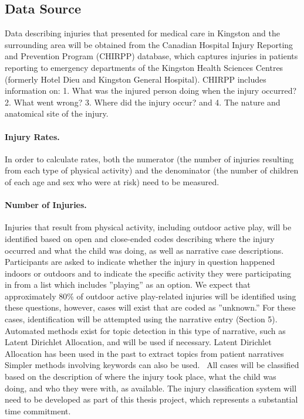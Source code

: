 \documentclass [11pt]{article}
\begin{document}
\subsection{Data Source} 

Data describing injuries that presented for medical care in Kingston and the surrounding area will be obtained from the Canadian Hospital Injury Reporting and Prevention Program (CHIRPP) database, which captures injuries in patients reporting to emergency departments of the Kingston Health Sciences Centres (formerly Hotel Dieu and Kingston General Hospital). CHIRPP includes information on: 1. What was the injured person doing when the injury occurred? 2. What went wrong? 3. Where did the injury occur? and 4. The nature and anatomical site of the injury. 

\paragraph{Injury Rates.} In order to calculate rates, both the numerator (the number of injuries resulting from each type of physical activity) and the denominator (the number of children of each age and sex who were at risk) need to be measured. 

\paragraph{Number of Injuries.} Injuries that result from physical activity, including outdoor active play, will be identified based on open and close-ended codes describing where the injury occurred and what the child was doing, as well as narrative case descriptions. Participants are asked to indicate whether the injury in question happened indoors or outdoors and to indicate the specific activity they were participating in from a list which includes ''playing'' as an option. We expect that approximately 80\% of outdoor active play-related injuries will be identified using these questions, however, cases will exist that are coded as ''unknown.'' For these cases, identification will be attempted using the narrative entry (Section 5). Automated methods exist for topic detection in this type of narrative, such as Latent Dirichlet Allocation\cite{Blei2003-ob}, and will be used if necessary. Latent Dirichlet Allocation has been used in the past to extract topics from patient narratives \cite{Hassanali2013-va,Cohen2014-fd} Simpler methods involving keywords can also be used.~\cite{Fridman2013-wq} All cases will be classified based on the description of where the injury took place, what the child was doing, and who they were with, as available. The injury classification system will need to be developed as part of this thesis project, which represents a substantial time commitment.
\end{document}
